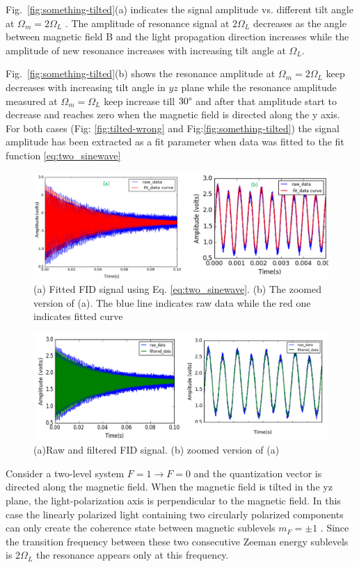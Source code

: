 Fig.~\ref{fig:something-tilted}(a) indicates the signal amplitude vs. different tilt angle at $\Omega_m=2\Omega_L$ . The amplitude of resonance signal at $2\Omega_L$  decreases as the angle between magnetic field B and the light propagation direction increases while the amplitude of new resonance  increases with increasing tilt angle at $\Omega_L$.
      
Fig.~\ref{fig:something-tilted}(b) shows the resonance amplitude at $\Omega_m=2\Omega_L$ keep decreases with increasing tilt angle in $yz$ plane while  the resonance amplitude measured at $\Omega_m=\Omega_L$ keep increase till $30\degree$ and after that amplitude start to decrease and reaches zero when the magnetic field is directed along the y axis. For both cases (Fig: \ref{fig:tilted-wrong} and Fig:\ref{fig:something-tilted}) the signal amplitude has been extracted as a fit parameter when data was fitted to the fit function \ref{eq:two_sinewave}
\begin{figure}[h]
\centering\includegraphics[width=0.9\linewidth]{figures/fitted_data_tilted_field.png}
\caption{(a) Fitted FID signal using Eq. \ref{eq:two_sinewave}. (b)  The zoomed version of (a). The  blue line indicates raw data while the red one indicates fitted curve}
\end{figure}
\begin{figure}[h]
\centering\includegraphics[width=0.9\linewidth]{figures/filtered_data.png}
\caption{(a)Raw and filtered FID signal. (b) zoomed version of (a)}
\end{figure}

Consider a two-level system $F=1\rightarrow F=0$ and the quantization vector is directed along the magnetic field. When the magnetic field is tilted in the yz plane, the light-polarization axis is perpendicular to the magnetic field. In this case the linearly polarized light containing two circularly polarized components can only create the coherence state between magnetic sublevels $m_F=\pm 1$ . Since the transition frequency between these two consecutive Zeeman energy sublevels is $2\Omega_L$  the resonance appears only at this frequency. 

